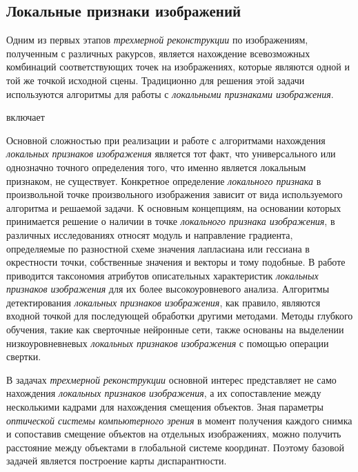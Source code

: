 \subsection{Локальные признаки изображений}
\label{sec_3d_models_computervision_local_features}

Одним из первых этапов \textit{трехмерной реконструкции} по изображениям, полученным с различных ракурсов, является нахождение всевозможных комбинаций соответствующих точек на изображениях, которые являются одной и той же точкой исходной сцены. Традиционно для решения этой задачи используются алгоритмы для работы с \textit{локальными признаками изображения}.

\begin{SCn}
    \begin{scnrelfromset}{включает}
    \end{scnrelfromset}
\end{SCn}

Основной сложностью при реализации и работе с алгоритмами нахождения \textit{локальных признаков изображения} является тот факт, что универсального или однозначно точного определения того, что именно является локальным признаком, не существует. Конкретное определение \textit{локального признака} в произвольной точке произвольного изображения зависит от вида используемого алгоритма и решаемой задачи. К основным концепциям, на основании которых принимается решение о наличии в точке \textit{локального признака изображения}, в различных исследованиях относят модуль и направление градиента, определяемые по разностной схеме значения лапласиана или гессиана в окрестности точки, собственные значения и векторы и тому подобные. В работе {} приводится таксономия атрибутов описательных характеристик \textit{локальных признаков изображения} для их более высокоуровневого анализа. Алгоритмы детектирования \textit{локальных признаков изображения}, как правило, являются входной точкой для последующей обработки другими методами. Методы глубкого обучения, такие как сверточные нейронные сети, также основаны на выделении низкоуровневневых \textit{локальных признаков изображения} с помощью операции свертки.

В задачах \textit{трехмерной реконструкции} основной интерес представляет не само нахождения \textit{локальных признаков изображения}, а их сопоставление между несколькими кадрами для нахождения смещения объектов. Зная параметры \textit{оптической системы компьютерного зрения} в момент получения каждого снимка и сопоставив смещение объектов на отдельных изображениях, можно получить расстояние между объектами в глобальной системе координат. Поэтому базовой задачей является построение карты диспарантности.


